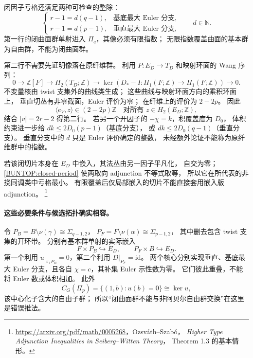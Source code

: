 \documentclass[UTF8,fontset=fandol,zihao=-4,oneside,openany]{ctexbook}
\theoremstyle{cjkplain}
\numberwithin{equation}{chapter}
\begin{document}
闭因子亏格还满足两种可检查的整除：
\begin{equation}
 \begin{cases}
 r-1=d(q-1),&\text{基底最大 Euler 分支},\\
 r-1=d(p-1),&\text{垂直最大 Euler 分支},
 \end{cases}\qquad d\in\mathbb N .
 \label{BUNTOP:genus-divisibility}
\end{equation}
第一行的闭曲面群单射进入 \(\Pi_q\)，其像必须有限指数；
无限指数覆盖曲面的基本群为自由群，不能为闭曲面群。

第二行不需要先证明像落在原纤维群。
利用 \(P:E_D\to T_D\) 和映射环面的 Wang 序列：
\[
 0\to\mathbb Z[F]\to H_2(T_D;\mathbb Z)
 \to\ker(D_*-I:H_1(F;\mathbb Z)\to H_1(F;\mathbb Z))\to0 .
\]
不变量核由 twist 支集外的曲线类生成；
这些曲线与映射环面方向的乘积环面上，
垂直切丛有非零截面，Euler 评价为零；
在纤维上的评价为 \(2-2p\)。
因此
\[
 \langle e_V,z\rangle\in(2-2p)\mathbb Z
 \quad\text{对所有 }z\in H_2(E_D;\mathbb Z),
\]
结合 \(|v|=2r-2\) 得第二行。
若另一个开因子的 \(-\chi=k\)，积覆盖度为 \(D_0\)，
体积约束进一步给
\(dk\le2D_0(p-1)\)（基底分支），
或 \(dk\le2D_0(q-1)\)（垂直分支）。
垂直分支中的 \(d\) 只是 Euler 评价确定的整数，
未经额外论证不能称为原纤维群中的指数。

若该闭切片本身在 \(E_D\) 中嵌入，其法丛由另一因子平凡化，
自交为零；\eqref{BUNTOP:closed-period} 使两取向 adjunction 不等式取等，
所以它在所代表的非挠同调类中亏格最小。
有限覆盖后仅局部嵌入的切片不能直接套用嵌入版 adjunction。%
\footnote{\url{https://arxiv.org/pdf/math/0005268}，Ozsv\'ath--Szab\'o，
\emph{Higher Type Adjunction Inequalities in Seiberg--Witten Theory}，
Theorem 1.3 的基本情形。}

\paragraph{这些必要条件与候选拓扑确实相容。}
令 \(P_B=B\setminus\nu(\gamma)\cong\Sigma_{q-1,2}\)，
\(P_F=F\setminus\nu(\alpha)\cong\Sigma_{p-1,2}\)，
其中删去包含 twist 支集的开环带。
分别有基本群单射的实际嵌入
\begin{equation}
 F\times P_B\hookrightarrow E_D,\qquad
 P_F\times B\hookrightarrow E_D .
 \label{BUNTOP:actual-product-cores}
\end{equation}
第一个利用 \(u|_{\pi_1P_B}=0\)，第二个利用 \(D|_{P_F}=\mathrm{id}\)。
两个核心分别实现垂直、基底最大 Euler 分支，且各自
\(\chi=c\)，其补集 Euler 示性数为零。
它们彼此重叠，不能将 Euler 数或体积相加。
此外
\[
 C_G(\Pi_p)=\{(1,b):u(b)=0\}\cong\ker u,
\]
该中心化子含大的自由子群；
所以“闭曲面群不能与非阿贝尔自由群交换”在这里是错误推法。
\end{document}
